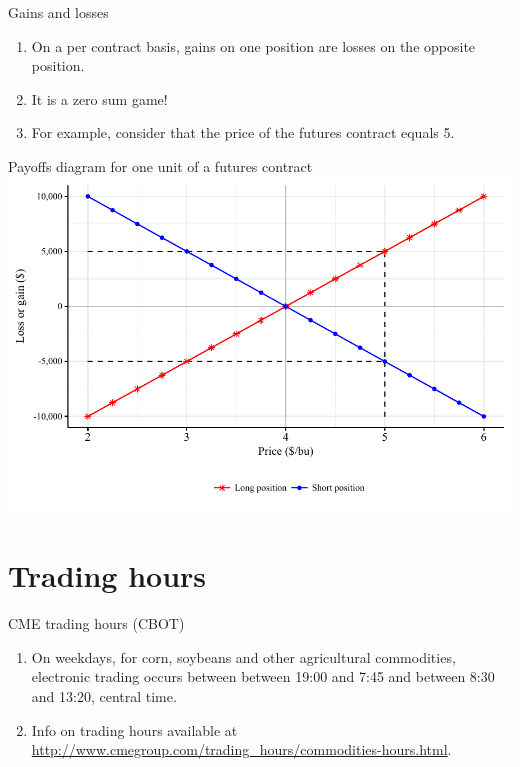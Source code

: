 \documentclass[table,xcolor=pdftex,dvipsnames]{beamer}\usepackage[]{graphicx}\usepackage[]{color}
\makeatletter
\def\maxwidth{ %
  \ifdim\Gin@nat@width>\linewidth
    \linewidth
  \else
    \Gin@nat@width
  \fi
}
\newenvironment{knitrout}{}{} %
\makeatother
\begin{document}

\begin{frame}{Gains and losses}
\begin{enumerate}[label=\textbullet]
      \item On a per contract basis, gains on one position are losses on the opposite position.
      \item It is a zero sum game!
      \item For example, consider that the price of the futures contract equals 5.
\end{enumerate}
\end{frame}


\begin{frame}{Payoffs diagram for one unit of a futures contract}
\begin{knitrout}
\color{fgcolor}
\includegraphics[width=\maxwidth]{figure/figure_position2-1} 

\end{knitrout}
\end{frame}

\section{Trading hours}


\begin{frame}{CME trading hours (CBOT)}
\begin{enumerate}[label=\textbullet]
      \item On weekdays, for corn, soybeans and other agricultural commodities, electronic trading occurs between between 19:00 and 7:45 and between 8:30 and 13:20, central time.
      \item Info on trading hours available at \url{http://www.cmegroup.com/trading_hours/commodities-hours.html}.
\end{enumerate}
\end{frame}
\end{document}
